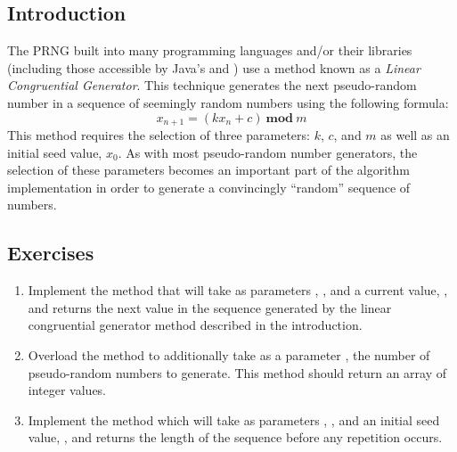 		\subsection{Introduction}
			The PRNG built into many programming languages and/or their libraries (including those accessible by Java's  and ) use a method known as a \emph{Linear Congruential Generator}. This technique generates the next pseudo-random number in a sequence of seemingly random numbers using the following formula:
			\[	x_{n + 1} = (kx_{n} + c)\ \mathbf{mod}\ m \]
			This method requires the selection of three parameters: $k$, $c$, and $m$ as well as an initial seed value, $x_0$. As with most pseudo-random number generators, the selection of these parameters becomes an important part of the algorithm implementation in order to generate a convincingly ``random'' sequence of numbers.
			\ \\[18pt]

		\subsection{Exercises}
			\begin{enumerate}
				\item Implement the  method that will take as parameters , ,  and a current value, , and returns the next value in the sequence generated by the linear congruential generator method described in the introduction.
				\item Overload the  method to additionally take as a parameter , the number of pseudo-random numbers to generate. This method should return an array of  integer values.
	      \item Implement the  method which will take as parameters , ,  and an initial seed value, , and returns the length of the sequence before any repetition occurs.
			\end{enumerate}

